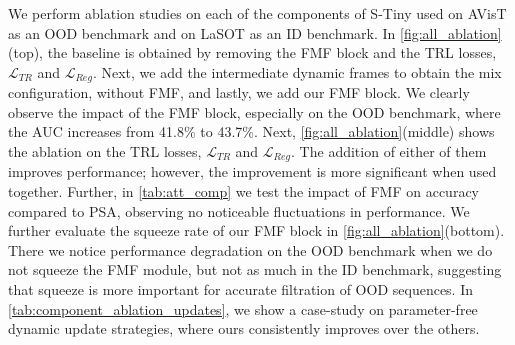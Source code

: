   
  
  We perform ablation studies on each of the components of S-Tiny used on AVisT as an OOD benchmark and on LaSOT as an ID benchmark. In \ref{fig:all_ablation}(top), the baseline is obtained by removing the FMF block and the TRL losses, $\mathcal{L}_{TR}$ and $\mathcal{L}_{Reg}$. Next, we add the intermediate dynamic frames to obtain the mix configuration, without FMF, and lastly, we add our FMF block. We clearly observe the impact of the FMF block, especially on the OOD benchmark, where the AUC increases from 41.8\% to 43.7\%.
  Next, \ref{fig:all_ablation}(middle) shows the ablation on the TRL losses, $\mathcal{L}_{TR}$ and $\mathcal{L}_{Reg}$. The addition of either of them improves performance; however, the improvement is more significant when used together.
  Further, in \ref{tab:att_comp} we test the impact of FMF on accuracy compared to PSA\cite{liu2021polarized}, observing no noticeable fluctuations in performance.
  We further evaluate the squeeze rate of our FMF block in \ref{fig:all_ablation}(bottom). There we notice performance degradation on the OOD benchmark when we do not squeeze the FMF module, but not as much in the ID benchmark, suggesting that squeeze is more important for accurate filtration of OOD sequences.
  In \ref{tab:component_ablation_updates}, we show a case-study on parameter-free dynamic update strategies, where ours consistently improves over the others.
  
